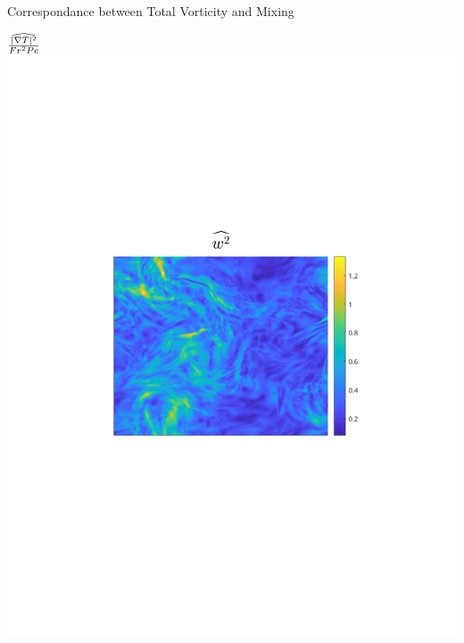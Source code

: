 \documentclass[aspecttatio=169]{beamer}
\begin{document}
\begin{frame}{Correspondance between Total Vorticity and Mixing}
    \emp

        \centering
        {\footnotesize $\frac{\widehat{|\nabla T|^2}}{Fr^2Pe}$}
    \emp
        \centering
        \includegraphics[width=1\textwidth]{images/Om1B30_uzrms_bar.pdf}
    \emp
        \centering

\end{frame}
\end{document}
